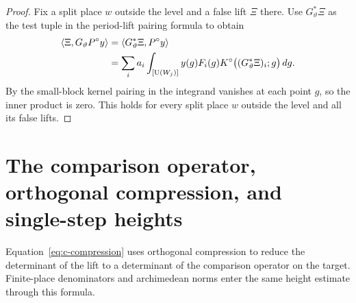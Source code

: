 \begin{proof}
Fix a split place $w$ outside the level and a false lift $\Xi$ there. Use $G_\vartheta^*\Xi$ as the test tuple in the period-lift pairing formula to obtain
\[
 \begin{aligned}
 \langle\Xi,G_\vartheta P^\circ y\rangle
 &=\langle G_\vartheta^*\Xi,P^\circ y\rangle\\
 &=\sum_i a_i\int_{[\operatorname{U}(W_j)]}
    y(g)F_i(g)K^\circ\bigl((G_\vartheta^*\Xi)_i;g\bigr)\,dg .
 \end{aligned}
\]
By  the small-block kernel pairing in the integrand vanishes at each point $g$, so the inner product is zero. This holds for every split place $w$ outside the level and all its false lifts.
\end{proof}

\section{The comparison operator, orthogonal compression, and single-step heights}
\label{sec:c-compression}

Equation~\eqref{eq:c-compression} uses orthogonal compression to reduce the determinant of the lift to a determinant of the comparison operator on the target. Finite-place denominators and archimedean norms enter the same height estimate through this formula.

